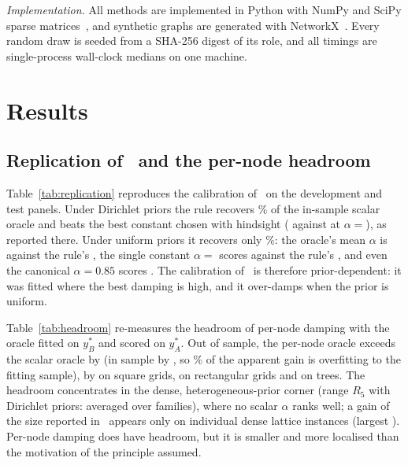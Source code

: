 \documentclass[11pt,a4paper]{article}
\theoremstyle{definition}
\theoremstyle{plain}
\begin{document}
\emph{Implementation.} All methods are implemented in Python with NumPy and SciPy sparse matrices~\cite{harris20,virtanen20}, and synthetic graphs are generated with NetworkX~\cite{hagberg08}. Every random draw is seeded from a SHA-256 digest of its role, and all timings are single-process wall-clock medians on one machine.

\FloatBarrier
\section{Results}\label{sec:results}

\subsection{\texorpdfstring{Replication of~\cite{konstantellos26} and the per-node headroom}{Replication of the calibration rule and the per-node headroom}}\label{sec:replication}

Table~\ref{tab:replication} reproduces the calibration of~\cite{konstantellos26} on the development and test panels. Under Dirichlet priors the rule recovers \RepPctDir\% of the in-sample scalar oracle and beats the best constant chosen with hindsight (\RepRuleDir{} against \RepBestConstDir{} at $\alpha={}$\RepBestConstAlphaDir{}), as reported there. Under uniform priors it recovers only \RepPctUnif\%: the oracle's mean $\alpha$ is \RepOracleAlphaUnif{} against the rule's \RepRuleAlpha, the single constant $\alpha={}$\RepConstAlphaUnif{} scores \RepConstUnif{} against the rule's \RepRuleUnif, and even the canonical $\alpha=0.85$ scores \RepFixedUnif. The calibration of~\cite{konstantellos26} is therefore prior-dependent: it was fitted where the best damping is high, and it over-damps when the prior is uniform.

\TabReplication

Table~\ref{tab:headroom} re-measures the headroom of per-node damping with the oracle fitted on $y^*_B$ and scored on $y^*_A$. Out of sample, the per-node oracle exceeds the scalar oracle by \HeadAll{} (in sample by \HeadApparent, so \HeadOverfitPct\% of the apparent gain is overfitting to the fitting sample), by \HeadGrid{} on square grids, \HeadRect{} on rectangular grids and \HeadTree{} on trees. The headroom concentrates in the dense, heterogeneous-prior corner (range $R_5$ with Dirichlet priors: \HeadCorner{} averaged over families), where no scalar $\alpha$ ranks well; a gain of the size reported in~\cite{konstantellos26} appears only on individual dense lattice instances (largest \HeadMax). Per-node damping does have headroom, but it is smaller and more localised than the motivation of the principle assumed.
\end{document}

